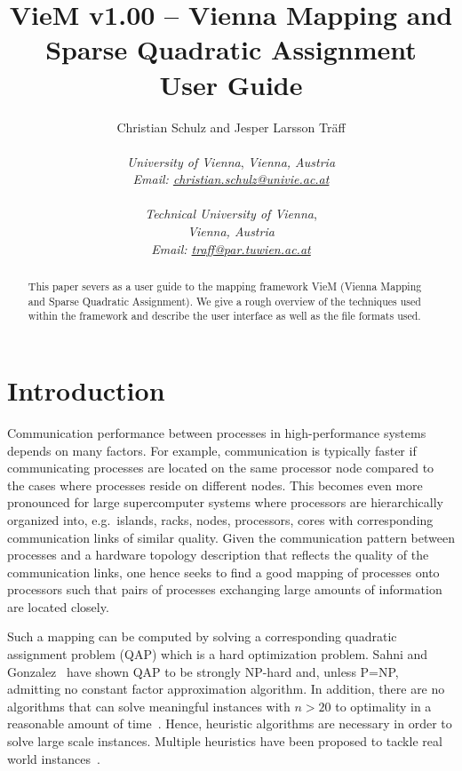 \documentclass[11pt]{article}
\newcommand{\eg}{e.g.\ }
\newcommand{\mytitle}{ {\color{red}VieM} v1.00 -- {\color{red}Vie}nna {\color{red}M}apping and Sparse Quadratic Assignment \\ User Guide}
\begin{document}
\title{\mytitle}
\author{Christian Schulz and Jesper Larsson Träff\\ 
        \ \\
	\textit{University of Vienna},
	\textit{Vienna, Austria} \\
	\textit{Email: \url{christian.schulz}\url{@univie.ac.at}}  \\
        \ \\
	\textit{Technical University of Vienna}, \\
	\textit{Vienna, Austria} \\
	\textit{Email: \url{traff}\url{@par.tuwien.ac.at}} }
\date{}

\maketitle
\begin{abstract}
This paper severs as a user guide to the mapping framework VieM (Vienna Mapping and Sparse Quadratic Assignment). We give a rough overview of the techniques used within the framework and describe the user interface as well as the file formats used. 
\end{abstract}

\tableofcontents
\thispagestyle{empty}

\vfill
\pagebreak
\section{Introduction}
Communication performance between processes in high-performance
systems depends on many factors. For example, communication is
typically faster if communicating processes are located on the same
processor node compared to the cases where processes reside on
different nodes.  This becomes even more pronounced for large
supercomputer systems where processors are hierarchically organized
into, \eg islands, racks, nodes, processors, cores with corresponding
communication links of similar quality.  Given the communication
pattern between processes and a hardware topology description that
reflects the quality of the communication links, one hence seeks to
find a good mapping of processes onto processors such that pairs of
processes exchanging large amounts of information are located closely.

Such a mapping can be computed by solving a corresponding quadratic
assignment problem (QAP) which is a hard optimization problem.  Sahni
and Gonzalez~\cite{SahniG76} have shown QAP to be strongly NP-hard
and, unless P=NP, admitting no constant factor approximation
algorithm.  In addition, there are no algorithms that can solve
meaningful instances with $n>20$ to optimality in a reasonable amount
of time~\cite{burkard1998quadratic}.  Hence, heuristic algorithms are
necessary in order to solve large scale instances.  Multiple
heuristics have been proposed to tackle real world
instances~\cite{brandfass2013rank,heider1972computationally,muller2013optimale}.
\end{document}
